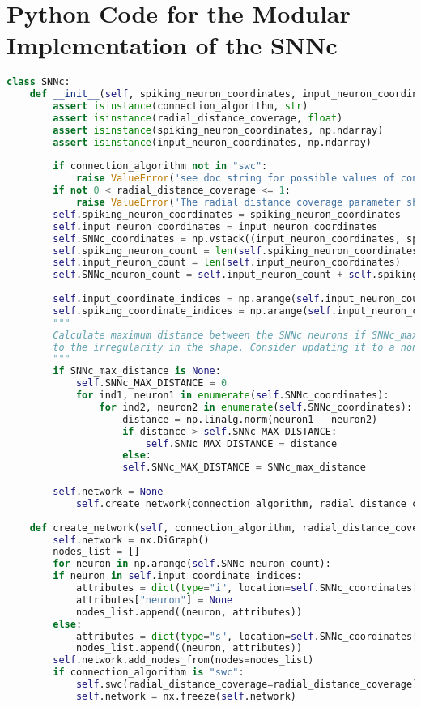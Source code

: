 \section{Python Code for the Modular Implementation of the SNNc}
\begin{lstlisting}[language=Python, caption={Python code for modular implementation of SNNc}]
class SNNc:
	def __init__(self, spiking_neuron_coordinates, input_neuron_coordinates, SNNc_max_distance=None, connection_algorithm="swc", radial_distance_coverage=0.1):
		assert isinstance(connection_algorithm, str)
		assert isinstance(radial_distance_coverage, float)
		assert isinstance(spiking_neuron_coordinates, np.ndarray)
		assert isinstance(input_neuron_coordinates, np.ndarray)
	
		if connection_algorithm not in "swc":
			raise ValueError('see doc string for possible values of connection algorithm parameter!!')
		if not 0 < radial_distance_coverage <= 1:
			raise ValueError('The radial distance coverage parameter should be between (0,1]!!')
		self.spiking_neuron_coordinates = spiking_neuron_coordinates
		self.input_neuron_coordinates = input_neuron_coordinates
		self.SNNc_coordinates = np.vstack((input_neuron_coordinates, spiking_neuron_coordinates))
		self.spiking_neuron_count = len(self.spiking_neuron_coordinates)
		self.input_neuron_count = len(self.input_neuron_coordinates)
		self.SNNc_neuron_count = self.input_neuron_count + self.spiking_neuron_count
	
		self.input_coordinate_indices = np.arange(self.input_neuron_count)
		self.spiking_coordinate_indices = np.arange(self.input_neuron_count, self.SNNc_neuron_count)
		"""
		Calculate maximum distance between the SNNc neurons if SNNc_max_distance=None. Uses a brute force approach due
		to the irregularity in the shape. Consider updating it to a non bruteforce approach later.
		"""
		if SNNc_max_distance is None:
			self.SNNc_MAX_DISTANCE = 0
			for ind1, neuron1 in enumerate(self.SNNc_coordinates):
				for ind2, neuron2 in enumerate(self.SNNc_coordinates):
					distance = np.linalg.norm(neuron1 - neuron2)
					if distance > self.SNNc_MAX_DISTANCE:
						self.SNNc_MAX_DISTANCE = distance
					else:
					self.SNNc_MAX_DISTANCE = SNNc_max_distance
	
		self.network = None
			self.create_network(connection_algorithm, radial_distance_coverage)
	
	def create_network(self, connection_algorithm, radial_distance_coverage):
		self.network = nx.DiGraph()
		nodes_list = []
		for neuron in np.arange(self.SNNc_neuron_count):
		if neuron in self.input_coordinate_indices:
			attributes = dict(type="i", location=self.SNNc_coordinates[neuron, :])
			attributes["neuron"] = None
			nodes_list.append((neuron, attributes))
		else:
			attributes = dict(type="s", location=self.SNNc_coordinates[neuron, :])
			nodes_list.append((neuron, attributes))
		self.network.add_nodes_from(nodes=nodes_list)
		if connection_algorithm is "swc":
			self.swc(radial_distance_coverage=radial_distance_coverage)
			self.network = nx.freeze(self.network)
	

\end{lstlisting}
